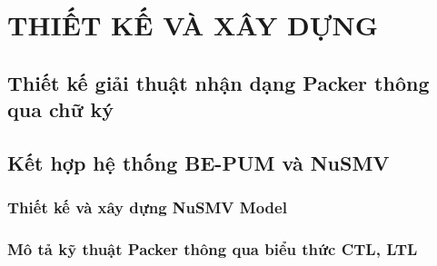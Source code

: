 
\newpage
\chapter{THIẾT KẾ VÀ XÂY DỰNG}

\section{Thiết kế giải thuật nhận dạng Packer thông qua chữ ký}

\section{Kết hợp hệ thống BE-PUM và NuSMV}

\subsection{Thiết kế và xây dựng NuSMV Model}

\subsection{Mô tả kỹ thuật Packer thông qua biểu thức CTL, LTL}

